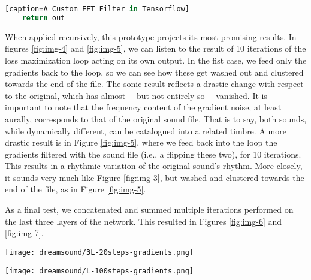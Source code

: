 \documentclass[a4paper,10pt,oneside]{article}
\begin{document}
\begin{sloppy}
\begin{lstlisting}[language=Python][caption=A Custom FFT Filter in Tensorflow]
    return out
\end{lstlisting}
When applied recursively, this prototype projects its most promising results. In figures \ref{fig:img-4} and \ref{fig:img-5}, we can listen to the result of 10 iterations of the loss maximization loop acting on its own output. In the fist case, we feed only the gradients back to the loop, so we can see how these get washed out and clustered towards the end of the file. The sonic result reflects a drastic change with respect to the original, which has almost ---but not entirely so--- vanished. It is important to note that the frequency content of the gradient noise, at least aurally, corresponds to that of the original sound file. That is to say, both sounds, while dynamically different, can be catalogued into a related timbre. A more drastic result is in Figure \ref{fig:img-5}, where we feed back into the loop the gradients filtered with the sound file (i.e., a flipping these two), for 10 iterations. This results in a rhythmic variation of the original sound's rhythm. More closely, it sounds very much like Figure \ref{fig:img-3}, but washed and clustered towards the end of the file, as in Figure \ref{fig:img-5}. 

As a final test, we concatenated and summed multiple iterations performed on the last three layers of the network. This resulted in Figures  \ref{fig:img-6} and  \ref{fig:img-7}.

\begin{figure*}[htbp]
       \centering
              \texttt{[image: dreamsound/3L-20steps-gradients.png]}
       \caption{Taking last three layers, outputting gradients recursively for 20 steps.}
       \label{fig:img-6}
\end{figure*}
\begin{figure*}[htbp]
       \centering
              \texttt{[image: dreamsound/L-100steps-gradients.png]}
       \caption{Taking last 3 layers, for 100 steps, recursively feeding the gradients}
       \label{fig:img-7}
\end{figure*}

\end{sloppy}
\end{document}
